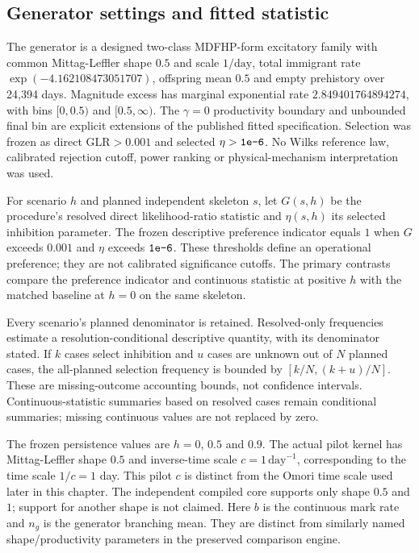\subsection{Generator settings and fitted statistic}

The generator is a designed two-class MDFHP-form excitatory family with common Mittag-Leffler shape $0.5$ and scale $1/\mathrm{day}$, total immigrant rate $\exp(-4.162108473051707)$, offspring mean $0.5$ and empty prehistory over 24,394 days. Magnitude excess has marginal exponential rate $2.849401764894274$, with bins $[0,0.5)$ and $[0.5,\infty)$. The $\gamma=0$ productivity boundary and unbounded final bin are explicit extensions of the published fitted specification.
Selection was frozen as direct $\mathrm{GLR}>0.001$ and selected $\eta>\text{\texttt{1e-6}}$. No Wilks reference law, calibrated rejection cutoff, power ranking or physical-mechanism interpretation was used.

For scenario $h$ and planned independent skeleton $s$, let $G(s,h)$ be the procedure's resolved direct likelihood-ratio statistic and $\eta(s,h)$ its selected inhibition parameter. The frozen descriptive preference indicator equals $1$ when $G$ exceeds $0.001$ and $\eta$ exceeds $\text{\texttt{1e-6}}$. These thresholds define an operational preference; they are not calibrated significance cutoffs. The primary contrasts compare the preference indicator and continuous statistic at positive $h$ with the matched baseline at $h=0$ on the same skeleton.

Every scenario's planned denominator is retained. Resolved-only frequencies estimate a resolution-conditional descriptive quantity, with its denominator stated. If $k$ cases select inhibition and $u$ cases are unknown out of $N$ planned cases, the all-planned selection frequency is bounded by $[k/N,(k+u)/N]$. These are missing-outcome accounting bounds, not confidence intervals. Continuous-statistic summaries based on resolved cases remain conditional summaries; missing continuous values are not replaced by zero.

The frozen persistence values are $h=0$, $0.5$ and $0.9$. The actual pilot kernel has Mittag-Leffler shape $0.5$ and inverse-time scale $c=1\,\mathrm{day}^{-1}$, corresponding to the time scale $1/c=1$ day. This pilot $c$ is distinct from the Omori time scale used later in this chapter. The independent compiled core supports only shape $0.5$ and $1$; support for another shape is not claimed. Here $b$ is the continuous mark rate and $n_g$ is the generator branching mean. They are distinct from similarly named shape/productivity parameters in the preserved comparison engine.

